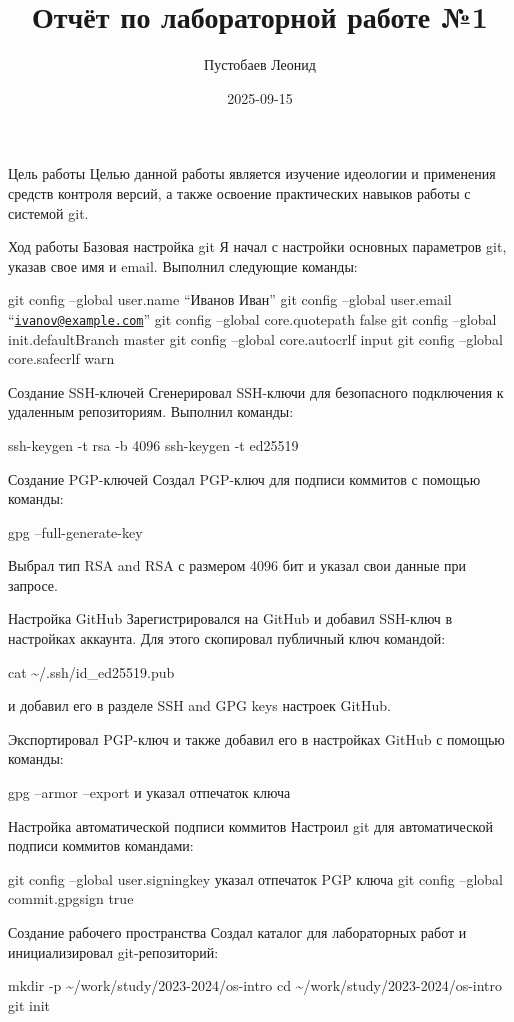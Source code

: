 \documentclass[
]{article}
\title{Отчёт по лабораторной работе №1}
\author{Пустобаев Леонид}
\date{2025-09-15}
\begin{document}
\maketitle

{
\setcounter{tocdepth}{2}
\tableofcontents
}
Цель работы Целью данной работы является изучение идеологии и применения
средств контроля версий, а также освоение практических навыков работы с
системой git.

Ход работы Базовая настройка git Я начал с настройки основных параметров
git, указав свое имя и email. Выполнил следующие команды:

git config --global user.name ``Иванов Иван'' git config --global
user.email
``\href{mailto:ivanov@example.com}{\nolinkurl{ivanov@example.com}}'' git
config --global core.quotepath false git config --global
init.defaultBranch master git config --global core.autocrlf input git
config --global core.safecrlf warn

Создание SSH-ключей Сгенерировал SSH-ключи для безопасного подключения к
удаленным репозиториям. Выполнил команды:

ssh-keygen -t rsa -b 4096 ssh-keygen -t ed25519

Создание PGP-ключей Создал PGP-ключ для подписи коммитов с помощью
команды:

gpg --full-generate-key

Выбрал тип RSA and RSA с размером 4096 бит и указал свои данные при
запросе.

Настройка GitHub Зарегистрировался на GitHub и добавил SSH-ключ в
настройках аккаунта. Для этого скопировал публичный ключ командой:

cat \textasciitilde/.ssh/id\_ed25519.pub

и добавил его в разделе SSH and GPG keys настроек GitHub.

Экспортировал PGP-ключ и также добавил его в настройках GitHub с помощью
команды:

gpg --armor --export и указал отпечаток ключа

Настройка автоматической подписи коммитов Настроил git для
автоматической подписи коммитов командами:

git config --global user.signingkey указал отпечаток PGP ключа git
config --global commit.gpgsign true

Создание рабочего пространства Создал каталог для лабораторных работ и
инициализировал git-репозиторий:

mkdir -p \textasciitilde/work/study/2023-2024/os-intro cd
\textasciitilde/work/study/2023-2024/os-intro git init
\end{document}
